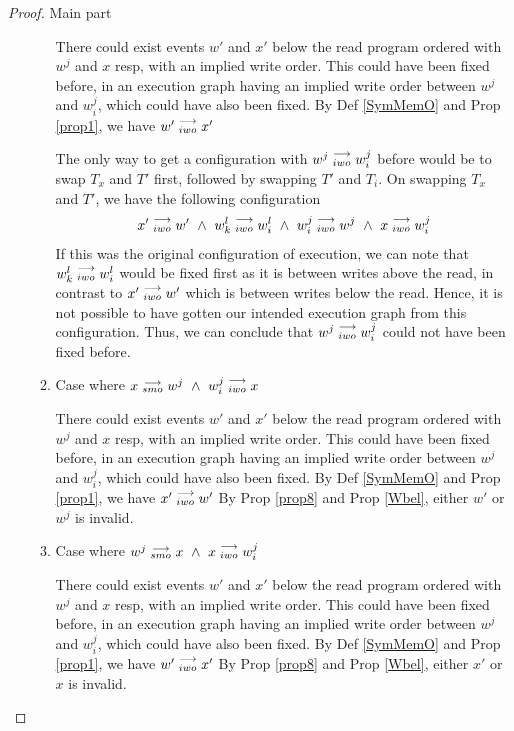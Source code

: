 \begin{proof}{Main part}
\begin{itemize}
\begin{enumerate}
                                There could exist events $w'$ and $x'$ below the read program ordered with $w^j$ and $x$ resp, with an implied write order. This could have been fixed before, in an execution graph having an implied write order between $w^j$ and $w_i^j$, which could have also been fixed.
                                By Def \ref{SymMemO} and Prop \ref{prop1}, we have $w'\stackrel{\longrightarrow}{_{iwo}}x'$
                                
                                The only way to get a configuration with $w^j\stackrel{\longrightarrow}{_{iwo}}w_i^j$ before would be to swap $T_x$ and $T'$ first, followed by swapping $T'$ and $T_i$. 
                                On swapping $T_x$ and $T'$, we have the following configuration 
                                \begin{align*}
                                    \reln{x'}{iwo}{w'} \ \wedge \ \reln{w_k^l}{iwo}{w_i^l} \ \wedge \ \reln{w_i^j}{iwo}{w^j} \ \wedge \ \reln{x}{iwo}{w_i^j} 
                                \end{align*}
                                If this was the original configuration of execution, we can note that $w_k^l\stackrel{\longrightarrow}{_{iwo}}w_i^l$ would be fixed first as it is between writes above the read, in contrast to $x'\stackrel{\longrightarrow}{_{iwo}}w'$ which is between writes below the read. Hence, it is not possible to have gotten our intended execution graph from this configuration. Thus, we can conclude that $w^j\stackrel{\longrightarrow}{_{iwo}}w_i^j$ could not have been fixed before.

                            \item Case where $x\stackrel{\longrightarrow}{_{smo}}w^j \ \wedge \ w_i^j\stackrel{\longrightarrow}{_{iwo}}x$
                                
                                There could exist events $w'$ and $x'$ below the read program ordered with $w^j$ and $x$ resp, with an implied write order. This could have been fixed before, in an execution graph having an implied write order between $w^j$ and $w_i^j$, which could have also been fixed.
                                By Def \ref{SymMemO} and Prop \ref{prop1}, we have $x'\stackrel{\longrightarrow}{_{iwo}}w'$
                                By Prop \ref{prop8} and Prop \ref{Wbel}, either $w'$ or $w^j$ is invalid.

                            \item Case where $w^j\stackrel{\longrightarrow}{_{smo}}x \ \wedge \ x\stackrel{\longrightarrow}{_{iwo}}w_i^j$
                                
                                There could exist events $w'$ and $x'$ below the read program ordered with $w^j$ and $x$ resp, with an implied write order. This could have been fixed before, in an execution graph having an implied write order between $w^j$ and $w_i^j$, which could have also been fixed.
                                By Def \ref{SymMemO} and Prop \ref{prop1}, we have $w'\stackrel{\longrightarrow}{_{iwo}}x'$
                                By Prop \ref{prop8} and Prop \ref{Wbel}, either $x'$ or $x$ is invalid.


\end{enumerate}
\end{itemize}
\end{proof}

